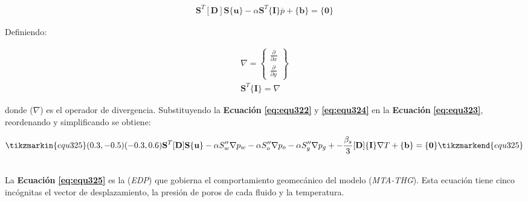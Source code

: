 \begin{ceqn} 
\label{eq:equ323} 
\begin{gather}
\mathbf{S}^T[\mathbf{D}]\mathbf{S}\{\mathbf{u}\} - \alpha\mathbf{S}^T\{\mathbf{I}\} \overline{p} + \{\mathbf{b}\}=\{\mathbf{0}\} 
\end{gather} 
\end{ceqn}

Definiendo:

\begin{ceqn} 
\begin{subequations} \label{eq:equ324} 
\begin{gather}
\nabla = \begin{Bmatrix} 
           \frac{\partial}{\partial x} \\[5pt]
           \frac{\partial}{\partial y}
           \end{Bmatrix}
           \label{eq:equ324a} \\[10pt]
\mathbf{S}^T\{\mathbf{I}\} = \nabla
\label{eq:equ324b}
\end{gather}  
\end{subequations} 
\end{ceqn}
donde ($\nabla$) es el operador de divergencia. Substituyendo la \textbf{Ecuación} \textbf{\ref{eq:equ322}} y \textbf{\ref{eq:equ324}} en la \textbf{Ecuación} \textbf{\ref{eq:equ323}}, reordenando y simplificando se obtiene:\\

\begin{ceqn} 
\begin{gather} \label{eq:equ325}
\tikzmarkin{equ325}(0.3,-0.5)(-0.3,0.6)
\mathbf{S}^T[\mathbf{D}]\mathbf{S}\{\mathbf{u}\} - 
\alpha S''_w\nabla p_w - \alpha S''_o\nabla p_o -  \alpha S''_g\nabla p_g + - \frac{\beta_s}{3}[\mathbf{D}]\{\mathbf{I}\} \nabla T  + \{\mathbf{b}\} = \{\mathbf{0}\}
\tikzmarkend{equ325}
\end{gather}  
\end{ceqn}
\\
La \textbf{Ecuación} \textbf{\ref{eq:equ325}} es la (\textit{EDP}) que gobierna el comportamiento geomecánico del modelo (\textit{MTA-THG}). Esta ecuación tiene cinco incógnitas el vector de desplazamiento, la presión de poros de cada fluido y la temperatura.\vspace{0.7cm}



